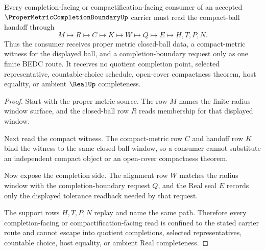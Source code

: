 \begin{theorem}
\label{thm:proper-metric-completion-boundary-compact-ball-handoff}
Every completion-facing or compactification-facing consumer of an accepted $\ProperMetricCompletionBoundaryUp$ carrier must read the compact-ball handoff through
$$
M \longmapsto R \longmapsto C \longmapsto K \longmapsto W \longmapsto Q \longmapsto E \longmapsto H,T,P,N .
$$
Thus the consumer receives proper metric closed-ball data, a compact-metric witness for the displayed ball, and a completion-boundary request only as one finite BEDC route. It receives no quotient completion point, selected representative, countable-choice schedule, open-cover compactness theorem, host equality, or ambient $\RealUp$ completeness.
\end{theorem}
\begin{proof}
Start with the proper metric source. The row $M$ names the finite radius-window surface, and the closed-ball row $R$ reads membership for that displayed window.

Next read the compact witness. The compact-metric row $C$ and handoff row $K$ bind the witness to the same closed-ball window, so a consumer cannot substitute an independent compact object or an open-cover compactness theorem.

Now expose the completion side. The alignment row $W$ matches the radius window with the completion-boundary request $Q$, and the Real seal $E$ records only the displayed tolerance readback needed by that request.

The support rows $H,T,P,N$ replay and name the same path. Therefore every completion-facing or compactification-facing read is confined to the stated carrier route and cannot escape into quotient completions, selected representatives, countable choice, host equality, or ambient Real completeness.
\end{proof}


